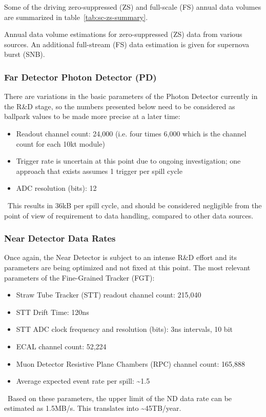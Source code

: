Some of the driving zero-suppressed (ZS) and full-scale (FS) annual
data volumes are summarized in table~\ref{tab:sc-zs-summary}.
\begin{table}[htbp]
  \centering
  \caption{Annual data volume estimations for zero-suppressed (ZS) data from various sources.
  An additional full-stream (FS) data estimation is given for supernova burst (SNB).}
  
  \label{tab:sc-zs-summary}
\end{table}


\subsubsection{Far Detector Photon Detector (PD)}
There are variations in the basic parameters of the Photon Detector currently in the R\&D stage,
so the numbers presented below need to be considered as ballpark values to be made more precise
at a later time:

\begin{itemize}
\item Readout channel count: 24,000 (i.e. four times 6,000 which is the channel count for each 10kt module)
\item Trigger rate is uncertain at this point due to ongoing investigation; one approach that exists assumes 1 trigger per spill cycle
\item ADC resolution (bits): 12
\end{itemize}
\
This results in 36kB per spill cycle, and should be considered negligible from the point of view of requirement to data handling, compared to other data sources.

\subsubsection{Near Detector Data Rates}
Once again, the Near Detector is subject to an intense R\&D effort and its
parameters are being optimized and not fixed at this point. The most relevant parameters
of the Fine-Grained Tracker (FGT):
\begin{itemize}
\item   Straw Tube Tracker (STT) readout channel count: 215,040
\item STT Drift Time: 120ns
\item STT ADC clock frequency and resolution (bits): 3ns intervals, 10 bit
\item ECAL channel count: 52,224
\item Muon Detector Resistive Plane Chambers (RPC) channel count: 165,888
\item Average expected event rate per spill: \textasciitilde 1.5
\end{itemize}
\
Based on these parameters, the upper limit of the ND data rate can be estimated as 1.5MB/s. This translates into \textasciitilde 45TB/year. 

